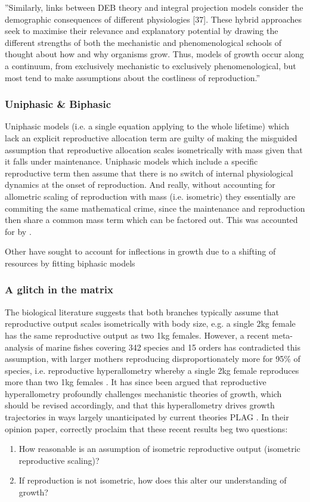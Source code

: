 \documentclass[a4paper]{article} %
\begin{document}
        ''Similarly, links between DEB theory and integral projection models consider the demographic consequences of different physiologies [37]. These hybrid approaches seek to maximise their relevance and explanatory potential by drawing the different strengths of both the mechanistic and phenomenological schools of thought about how and why organisms grow. Thus, models of growth occur along a continuum, from exclusively mechanistic to exclusively phenomenological, but most tend to make assumptions about the costliness of reproduction.''
        
        \subsubsection{Uniphasic \& Biphasic}
        Uniphasic models (i.e. a single equation applying to the whole lifetime) which lack an explicit reproductive allocation term are guilty of making the misguided assumption that reproductive allocation scales isometrically with mass given that it falls under maintenance. Uniphasic models which include a specific reproductive term then assume that there is no switch of internal physiological dynamics at the onset of reproduction. And really, without accounting for allometric scaling of reproduction with mass (i.e. isometric) they essentially are commiting the same mathematical crime, since the maintenance and reproduction then share a common mass term which can be factored out. This was accounted for by \cite{Charnov2001}.

        Other have sought to account for inflections in growth due to a shifting of resources by fitting biphasic models 

        \subsubsection{A glitch in the matrix}

        The biological literature suggests that both branches typically assume that reproductive output scales isometrically with body size, e.g. a single 2kg female has the same reproductive output as two 1kg females. However, a recent meta-analysis of marine fishes covering 342 species and 15 orders has contradicted this assumption, with larger mothers reproducing disproportionately more for 95\% of species, i.e. reproductive hyperallometry whereby a single 2kg female reproduces more than two 1kg females \autocite{Barneche2018d}. It has since been argued that reproductive hyperallometry profoundly challenges mechanistic theories of growth, which should be revised accordingly, and that this hyperallometry drives growth trajectories in ways largely unanticipated by current theories PLAG \autocite{Marshall2019b}. In their opinion paper, \cite{Marshall2019b} correctly proclaim that these recent results beg two questions:
        \begin{enumerate}
            \item How reasonable is an assumption of isometric reproductive output (isometric reproductive scaling)?
            \item If reproduction is not isometric, how does this alter our understanding of growth?
        \end{enumerate}
\end{document}
